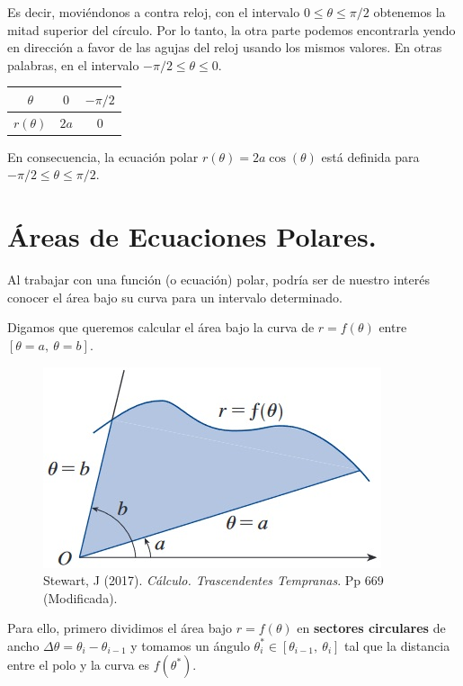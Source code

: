 \documentclass[12pt]{article}
\begin{document}
Es decir, moviéndonos a contra reloj, con el intervalo $0 \leq \theta \leq \pi / 2$ obtenemos la mitad superior del círculo. Por lo tanto, la otra parte podemos encontrarla yendo en dirección a favor de las agujas del reloj usando los mismos valores. En otras palabras, en el intervalo $-\pi/2 \leq \theta \leq 0$.

\begin{table}[hbt!]
\centering

\begin{tabular}{c|c c}
$\theta$ & $0$ & $-\pi / 2$ \\
\hline
$r(\theta)$ & $2a$ & $0$
\end{tabular}

\end{table}

En consecuencia, la ecuación polar $r(\theta) = 2a \cos(\theta)$ está definida para $-\pi/2 \leq \theta \leq \pi/2$.


\section{Áreas de Ecuaciones Polares.}

Al trabajar con una función (o ecuación) polar, podría ser de nuestro interés conocer el área bajo su curva para un intervalo determinado.

Digamos que queremos calcular el área bajo la curva de $r = f(\theta)$ entre $[\theta = a, \ \theta = b]$.

\newpage

\begin{figure}[hbt!]
\centering
\includegraphics[scale=0.65]{01_area-ec-polar.jpg}
\caption{Stewart, J (2017). \textit{Cálculo. Trascendentes Tempranas}. Pp 669 (Modificada).}
\end{figure}

Para ello, primero dividimos el área bajo $r = f(\theta)$ en \textbf{sectores circulares} de ancho $\Delta \theta = \theta_{i} - \theta_{i - 1}$ y tomamos un ángulo $\theta_{i}^{*} \in [\theta_{i - 1}, \ \theta_{i}]$ tal que la distancia entre el polo y la curva es $f(\theta^{*})$.
\end{document}
